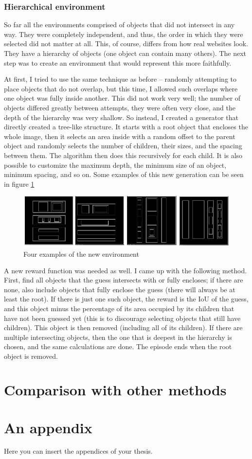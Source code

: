 \documentclass[
  digital,     %
  oneside,     %
  nosansbold,  %
  nocolorbold, %
  lof,         %
  lot,         %
]{fithesis4}
\begin{document}
\subsection{Hierarchical environment}

So far all the environments comprised of objects that did not intersect in any way. They were completely independent, and thus, the order in which they were selected did not matter at all. This, of course, differs from how real websites look. They have a hierarchy of objects (one object can contain many others). The next step was to create an environment that would represent this more faithfully.

At first, I tried to use the same technique as before -- randomly attempting to place objects that do not overlap, but this time, I allowed such overlaps where one object was fully inside another. This did not work very well; the number of objects differed greatly between attempts, they were often very close, and the depth of the hierarchy was very shallow. So instead, I created a generator that directly created a tree-like structure. It starts with a root object that encloses the whole image, then it selects an area inside with a random offset to the parent object and randomly selects the number of children, their sizes, and the spacing between them. The algorithm then does this recursively for each child. It is also possible to customize the maximum depth, the minimum size of an object, minimum spacing, and so on. Some examples of this new generation can be seen in figure \ref{fig:env7}

\begin{figure}
    \centering
    \includegraphics[width=1\linewidth]{env_examples/env7.png}
    \caption{Four examples of the new environment}
    \label{fig:env7}
\end{figure}

A new reward function was needed as well. I came up with the following method. First, find all objects that the guess intersects with or fully encloses; if there are none, also include objects that fully enclose the guess (there will always be at least the root). If there is just one such object, the reward is the IoU of the guess, and this object minus the percentage of its area occupied by its children that have not been guessed yet (this is to discourage selecting objects that still have children). This object is then removed (including all of its children). If there are multiple intersecting objects, then the one that is deepest in the hierarchy is chosen, and the same calculations are done. The episode ends when the root object is removed.

\chapter{Comparison with other methods}


\printbibliography[heading=bibintoc] %


\appendix %
\chapter{An appendix}
Here you can insert the appendices of your thesis.
\end{document}
